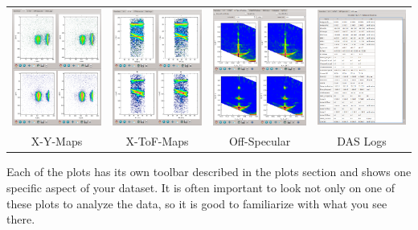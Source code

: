  \begin{tabular}{cccc}
 \includegraphics[width=103pt]{screenshots/xymaps.png}&
 \includegraphics[width=103pt]{screenshots/xtofmaps.png}&
 \includegraphics[width=103pt]{screenshots/offspecmaps.png}&
 \includegraphics[width=103pt]{screenshots/daslogs.png}\\
  X-Y-Maps & X-ToF-Maps & Off-Specular & DAS Logs
 \end{tabular}

 Each of the plots has its own toolbar described in the plots section and shows one specific aspect of your dataset. 
 It is often important to look not only on one of these plots to analyze the data, so it is good to familiarize with what you see there.
 
